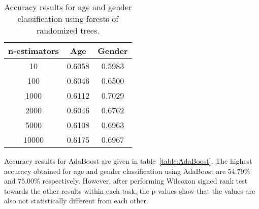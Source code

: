 \documentclass[a4paper]{llncs}
\begin{document}
\begin{table}[!htbp]
\centering
\begin{tabular}{|c|c|c|}
\hline
n-estimators & Age    & Gender \\ \hline
10           & 0.6058 & 0.5983 \\ \hline
100          & 0.6046 & 0.6500 \\ \hline
1000         & 0.6112 & 0.7029 \\ \hline
2000         & 0.6046 & 0.6762 \\ \hline
5000         & 0.6108 & 0.6963 \\ \hline
10000        & 0.6175 & 0.6967 \\ \hline
\end{tabular}
\caption{Accuracy results for age and gender classification using forests of randomized trees.}
\label{table:RandomForests}
\end{table}

%
%
Accuracy results for AdaBoost are given in table~\ref{table:AdaBoost}. The highest accuracy obtained for age and gender classification using AdaBoost are 54.79\% and 75.00\% respectively. However, after performing Wilcoxon signed rank test~\cite{wilcoxon1945individual} towards the other results within each task, the p-values show that the values are also not statistically different from each other. 
\end{document}
